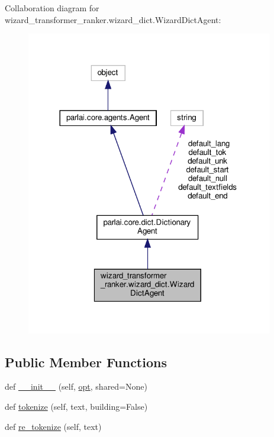 Collaboration diagram for wizard\+\_\+transformer\+\_\+ranker.\+wizard\+\_\+dict.\+Wizard\+Dict\+Agent\+:
\nopagebreak
\begin{figure}[H]
\begin{center}
\leavevmode
\includegraphics[width=305pt]{classwizard__transformer__ranker_1_1wizard__dict_1_1WizardDictAgent__coll__graph}
\end{center}
\end{figure}
\subsection*{Public Member Functions}
\begin{DoxyCompactItemize}
\item 
def \hyperlink{classwizard__transformer__ranker_1_1wizard__dict_1_1WizardDictAgent_adb8a1ecd2f5090bee76d334513dd7665}{\+\_\+\+\_\+init\+\_\+\+\_\+} (self, \hyperlink{classwizard__transformer__ranker_1_1wizard__dict_1_1WizardDictAgent_a923546de802c8a2afd98f613c2c6d3a1}{opt}, shared=None)
\item 
def \hyperlink{classwizard__transformer__ranker_1_1wizard__dict_1_1WizardDictAgent_a90fd8189d6fd3007d7ebd6ffac5104ed}{tokenize} (self, text, building=False)
\item 
def \hyperlink{classwizard__transformer__ranker_1_1wizard__dict_1_1WizardDictAgent_a010c2de45246c28eee6b7793de1e3754}{re\+\_\+tokenize} (self, text)
\end{DoxyCompactItemize}
